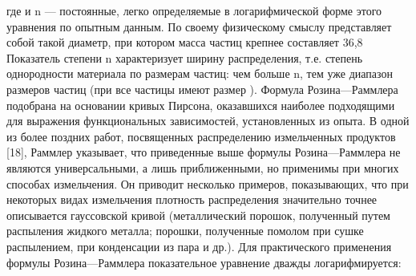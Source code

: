 где   и n — постоянные, легко определяемые в логарифмической форме этого уравнения по опытным данным. 
По своему физическому смыслу   представляет собой такой диаметр, при котором масса частиц крепнее   составляет 36,8%
Показатель степени n характеризует ширину распределения, т.е. степень однородности материала по размерам частиц: чем больше n, тем уже диапазон размеров частиц (при   все частицы имеют размер  ).
Формула Розина—Раммлера подобрана на основании кривых Пирсона, оказавшихся наиболее подходящими для выражения функциональных зависимостей, установленных из опыта. 
В одной из более поздних работ, посвященных распределению измельченных продуктов [18], Раммлер указывает, что приведенные выше формулы Розина—Раммлера не являются универсальными, а лишь приближенными, но применимы при многих способах измельчения. Он приводит несколько примеров, показывающих, что при некоторых видах измельчения плотность распределения значительно точнее описывается гауссовской кривой (металлический порошок, полученный путем распыления жидкого металла; порошки, полученные помолом при сушке распылением, при конденсации из пара и др.). 
Для практического применения формулы Розина—Раммлера показательное уравнение дважды логарифмируется: 
 
